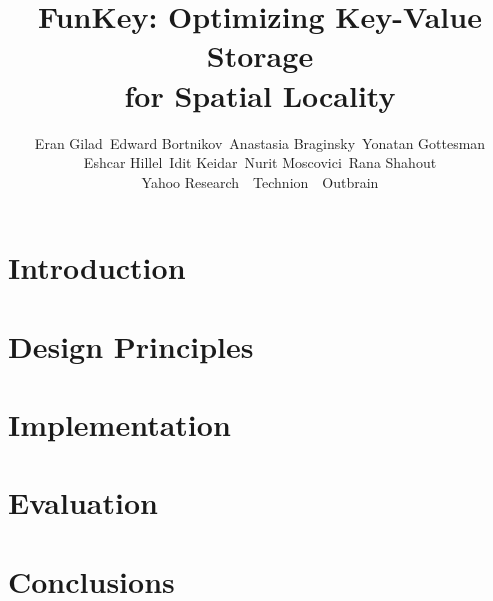 \documentclass[letterpaper,twocolumn,10pt]{article}
\date{}
\newcommand{\sys}{FunKey}
\begin{document}
\title{\sys: Optimizing Key-Value Storage\\ for Spatial Locality} 
\author{
Eran Gilad\footnotemark[1] \ 
Edward Bortnikov\footnotemark[1] \
Anastasia Braginsky\footnotemark[1] \ 
Yonatan Gottesman\footnotemark[1]  \\
Eshcar Hillel\footnotemark[1]  \
Idit Keidar\footnotemark[1]\footnotemark[2] \ 
Nurit Moscovici\footnotemark[3]  \
Rana Shahout\footnotemark[2]\\ 
\footnotemark[1] Yahoo Research\ \ \footnotemark[2] Technion\ \ \footnotemark[3] Outbrain
}
\maketitle
\begin{abstract}

\end{abstract}



\section{Introduction}


\section{Design Principles}
\label{sec:principles}


%

\section{Implementation}
\label{sec:impl}


\section{Evaluation}
\label{sec:eval}


%

\section{Conclusions}
\label{sec:conclusions}






\end{document}
